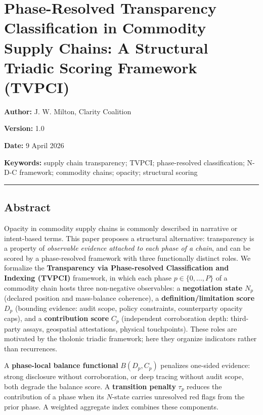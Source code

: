 \documentclass[
  11pt,
  letterpaper,
]{article}
\author{}
\date{}
\begin{document}
\section{Phase-Resolved Transparency Classification in Commodity Supply
Chains: A Structural Triadic Scoring Framework
(TVPCI)}\label{phase-resolved-transparency-classification-in-commodity-supply-chains-a-structural-triadic-scoring-framework-tvpci}

\textbf{Author:} J. W. Milton, Clarity Coalition

\textbf{Version:} 1.0

\textbf{Date:} 9 April 2026

\textbf{Keywords:} supply chain transparency; TVPCI; phase-resolved
classification; N-D-C framework; commodity chains; opacity; structural
scoring

\begin{center}\rule{0.5\linewidth}{0.5pt}\end{center}

\subsection{Abstract}\label{abstract}

Opacity in commodity supply chains is commonly described in narrative or
intent-based terms. This paper proposes a structural alternative:
transparency is a property of \emph{observable evidence attached to each
phase of a chain}, and can be scored by a phase-resolved framework with
three functionally distinct roles. We formalize the \textbf{Transparency
via Phase-resolved Classification and Indexing (TVPCI)} framework, in
which each phase \(p \in \{0,\ldots,P\}\) of a commodity chain hosts
three non-negative observables: a \textbf{negotiation state} \(N_p\)
(declared position and mass-balance coherence), a
\textbf{definition/limitation score} \(D_p\) (bounding evidence: audit
scope, policy constraints, counterparty opacity caps), and a
\textbf{contribution score} \(C_p\) (independent corroboration depth:
third-party assays, geospatial attestations, physical touchpoints).
These roles are motivated by the tholonic triadic framework; here they
organize indicators rather than recurrences.

A \textbf{phase-local balance functional} \(B(D_p, C_p)\) penalizes
one-sided evidence: strong disclosure without corroboration, or deep
tracing without audit scope, both degrade the balance score. A
\textbf{transition penalty} \(\tau_p\) reduces the contribution of a
phase when its \(N\)-state carries unresolved red flags from the prior
phase. A weighted aggregate index combines these components.
\end{document}
